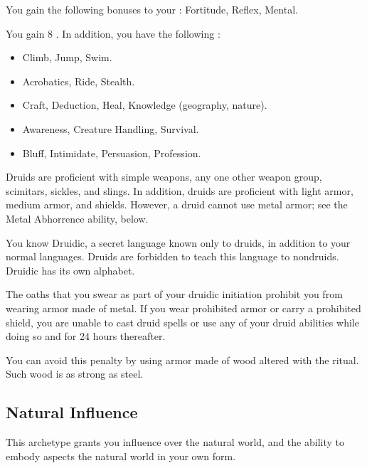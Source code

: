         You gain the following bonuses to your :  Fortitude,  Reflex,  Mental.

        You gain 8 .
        In addition, you have the following :
        \begin{itemize}
            \item {} Climb, Jump, Swim.
            \item {} Acrobatics, Ride, Stealth.
            \item {} Craft, Deduction, Heal, Knowledge (geography, nature).
            \item {} Awareness, Creature Handling, Survival.
            \item {} Bluff, Intimidate, Persuasion, Profession.
        \end{itemize}

        Druids are proficient with simple weapons, any one other weapon group, scimitars, sickles, and slings.
        In addition, druids are proficient with light armor, medium armor, and shields.
        However, a druid cannot use metal armor; see the Metal Abhorrence ability, below.

        You know Druidic, a secret language known only to druids, in addition to your normal languages.
        Druids are forbidden to teach this language to nondruids.
        Druidic has its own alphabet.

        The oaths that you swear as part of your druidic initiation prohibit you from wearing armor made of metal.
        If you wear prohibited armor or carry a prohibited shield, you are unable to cast druid spells or use any of your  druid abilities while doing so and for 24 hours thereafter.

        You can avoid this penalty by using armor made of wood altered with the  ritual.
        Such wood is as strong as steel.

    \subsection{Natural Influence}
        This archetype grants you influence over the natural world, and the ability to embody aspects the natural world in your own form.

